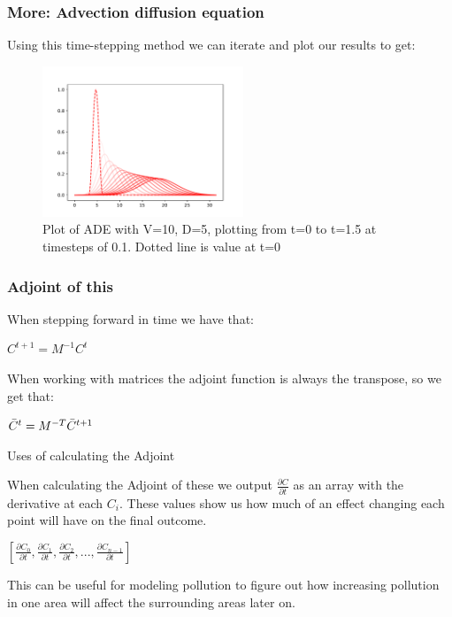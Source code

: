 \documentclass{beamer}
\begin{document}
\begin{frame}
\frametitle{More: Advection diffusion equation}

Using this time-stepping method we can iterate and plot our results to get:

\begin{figure}[h]
    \centering
    \includegraphics[width=6cm]{images/Figure_1_ODE2.pdf}
    \caption{Plot of ADE with V=10, D=5, plotting from t=0 to t=1.5 at timesteps of 0.1. Dotted line is value at t=0}
    \label{fig:ODE}
\end{figure}

\end{frame}


\begin{frame}
\frametitle{Adjoint of this}

When stepping forward in time we have that:

\begin{center}
    $C^{t+1} = M^{-1} C^{t}$
\end{center}

When working with matrices the adjoint function is always the transpose, so we get that:

\begin{center}
    $\Bar{C}^{t} = M^{-T} \Bar{C}^{t+1}$
\end{center}

\end{frame}

\begin{frame}{Uses of calculating the Adjoint}

When calculating the Adjoint of these we output $\frac{\partial C}{\partial t}$ as an array with the derivative at each $C_i$. These values show us how much of an effect changing each point will have on the final outcome.

\begin{center}
    $[\frac{\partial C_0}{\partial t}, \frac{\partial C_1}{\partial t}, \frac{\partial C_2}{\partial t}, ..., \frac{\partial C_{n-1}}{\partial t}]$
\end{center}


This can be useful for modeling pollution to figure out how increasing pollution in one area will affect the surrounding areas later on.

\end{frame}
\end{document}

